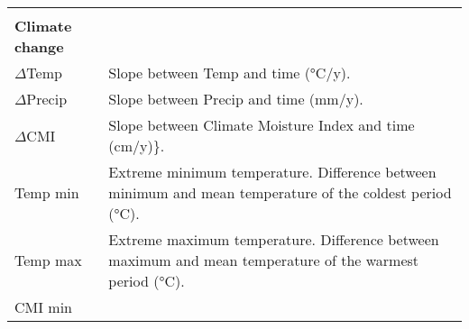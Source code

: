 \documentclass[
  a4paperpaper,
]{article}
\begin{document}
\begin{longtable}[]{@{}ll@{}}
\begin{minipage}[t]{0.72\columnwidth}
\end{minipage}\tabularnewline
\begin{minipage}[t]{0.22\columnwidth}\raggedright
\textbf{Climate change}\strut
\end{minipage} & \begin{minipage}[t]{0.72\columnwidth}\raggedright
\strut
\end{minipage}\tabularnewline
\begin{minipage}[t]{0.22\columnwidth}\raggedright
\(\Delta\)Temp\strut
\end{minipage} & \begin{minipage}[t]{0.72\columnwidth}\raggedright
Slope between Temp and time (°C/y).\strut
\end{minipage}\tabularnewline
\begin{minipage}[t]{0.22\columnwidth}\raggedright
\(\Delta\)Precip\strut
\end{minipage} & \begin{minipage}[t]{0.72\columnwidth}\raggedright
Slope between Precip and time (mm/y).\strut
\end{minipage}\tabularnewline
\begin{minipage}[t]{0.22\columnwidth}\raggedright
\(\Delta\)CMI\strut
\end{minipage} & \begin{minipage}[t]{0.72\columnwidth}\raggedright
Slope between Climate Moisture Index and time (cm/y)\}.\strut
\end{minipage}\tabularnewline
\begin{minipage}[t]{0.22\columnwidth}\raggedright
Temp min\strut
\end{minipage} & \begin{minipage}[t]{0.72\columnwidth}\raggedright
Extreme minimum temperature. Difference between minimum and mean
temperature of the coldest period (°C).\strut
\end{minipage}\tabularnewline
\begin{minipage}[t]{0.22\columnwidth}\raggedright
Temp max\strut
\end{minipage} & \begin{minipage}[t]{0.72\columnwidth}\raggedright
Extreme maximum temperature. Difference between maximum and mean
temperature of the warmest period (°C).\strut
\end{minipage}\tabularnewline
\begin{minipage}[t]{0.22\columnwidth}\raggedright
CMI min\strut
\end{minipage} & \begin{minipage}[t]{0.72\columnwidth}\raggedright

\end{minipage}
\end{longtable}
\end{document}
